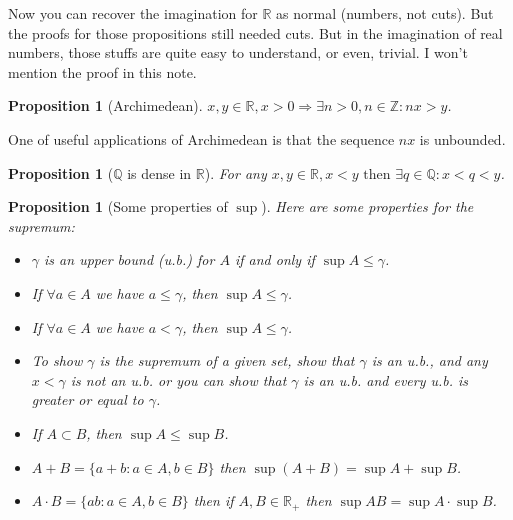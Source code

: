 \documentclass[12pt]{article}
\newcommand{\RR}{\mathbb{R}}   %
\newcommand{\ZZ}{\mathbb{Z}}   %
\newcommand{\QQ}{\mathbb{Q}}   %
\theoremstyle{definition}
\theoremstyle{plain}
\newtheorem{proposition}[definition]{Proposition}
\begin{document}
\begin{note}
Now you can recover the imagination for $\RR$ as normal (numbers, not cuts). But the proofs for those propositions still needed cuts. But in the imagination of real numbers, those stuffs are quite easy to understand, or even, trivial. I won't mention the proof in this note.
\end{note}

\begin{proposition}[Archimedean]
$x,y \in \RR, x>0 \Rightarrow \exists n>0, n\in\ZZ: nx>y$.
\end{proposition}

\begin{note}
One of useful applications of Archimedean is that the sequence $nx$ is unbounded.
\end{note}

\begin{proposition}[$\QQ$ is dense in $\RR$]
For any $x,y\in\RR, x<y \text{ then }\exists q\in\QQ: x<q<y$.
\end{proposition}

\begin{proposition}[Some properties of $\sup$]
Here are some properties for the supremum:
\begin{itemize}
    \item $\gamma$ is an upper bound (u.b.) for $A$ if and only if $\sup A \le \gamma$.
    \item If $\forall a \in A$ we have $a\le\gamma$, then $\sup A \le \gamma$.
    \item If $\forall a \in A$ we have $a<\gamma$, then $\sup A \le \gamma$.
    \item To show $\gamma$ is the supremum of a given set, show that $\gamma$ is an u.b., and any $x < \gamma$ is not an u.b. or you can show that $\gamma$ is an u.b. and every u.b. is greater or equal to $\gamma$.
    \item If $A\subset B$, then $\sup A \le \sup B$.
    \item $A+B=\{a+b: a\in A, b\in B\}$ then $\sup(A+B) = \sup A + \sup B$.
    \item $A \cdot B = \{ab: a \in A, b\in B\}$ then if $A, B \in \RR_+$ then $\sup AB = \sup A \cdot \sup B$.
\end{itemize}
\end{proposition}
\end{document}

